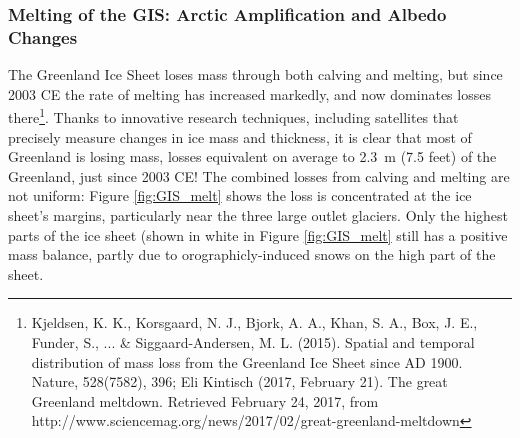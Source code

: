 \subsubsection{Melting of the GIS: Arctic Amplification and Albedo Changes}
The Greenland Ice Sheet loses mass through both calving and melting, but since 2003 CE the rate of melting has increased markedly, and now dominates losses there\footnote{Kjeldsen, K. K., Korsgaard, N. J., Bjork, A. A., Khan, S. A., Box, J. E., Funder, S., ... \& Siggaard-Andersen, M. L. (2015). Spatial and temporal distribution of mass loss from the Greenland Ice Sheet since AD 1900. Nature, 528(7582), 396; Eli Kintisch (2017, February 21). The great Greenland meltdown. Retrieved February 24, 2017, from http://www.sciencemag.org/news/2017/02/great-greenland-meltdown}. Thanks to innovative research techniques, including satellites that precisely measure changes in ice mass and thickness, it is clear that most of Greenland is losing mass, losses equivalent on average to \SI{2.3}{\metre} (7.5 feet) of the Greenland, just since 2003 CE! The combined losses from calving and melting are not uniform: Figure \ref{fig:GIS_melt} shows the loss is concentrated at the ice sheet's margins, particularly near the three large outlet glaciers. Only the highest parts of the ice sheet (shown in white in Figure \ref{fig:GIS_melt} still has a positive mass balance, partly due to orographicly-induced snows on the high part of the sheet.\\
